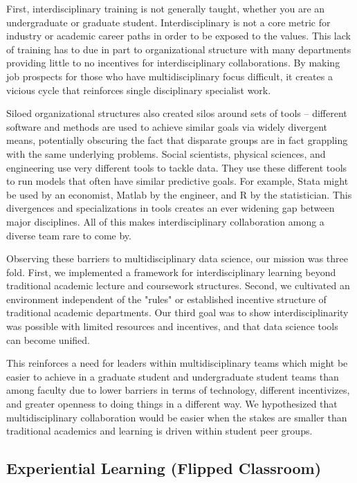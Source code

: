\documentclass{sig-alternate}
\begin{document}
First, interdisciplinary training is not generally taught, whether you are an undergraduate or graduate student. Interdisciplinary is not a core metric for industry or academic career paths in order to be exposed to the values. This lack of training has to due in part to organizational structure with many departments providing little to no incentives for interdisciplinary collaborations. By making job prospects for those who have multidisciplinary focus difficult, it creates a vicious cycle that reinforces single disciplinary specialist work. 

Siloed organizational structures also created silos around sets of tools -- different software and methods are used to achieve similar goals via widely divergent means, potentially obscuring the fact that disparate groups are in fact grappling with the same underlying problems. Social scientists, physical sciences, and engineering use very different tools to tackle data. They use these different tools to run models that often have similar predictive goals. For example, Stata \cite{stata2005stata} might be used by an economist, Matlab \cite{incorporation2005matlab} by the engineer, and R \cite{RCoreTeam2014} by the statistician. This divergences and specializations in tools creates an ever widening gap between major disciplines.  All of this makes interdisciplinary collaboration among a diverse team rare to come by.

Observing these barriers to multidisciplinary data science, our mission was three fold. First, we implemented a framework for interdisciplinary learning beyond traditional academic lecture and coursework structures. Second, we cultivated an environment independent of the "rules" or established incentive structure of traditional academic departments. Our third goal was to show interdisciplinarity was possible with limited resources and incentives, and that data science tools can become unified. 

This reinforces a need for leaders within multidisciplinary teams which might be easier to achieve in a graduate student and undergraduate student teams than among faculty due to lower barriers in terms of technology, different incentivizes, and greater openness to doing things in a different way. We hypothesized that multidisciplinary collaboration would be easier when the stakes are smaller than traditional academics and learning is driven within student peer groups.

\subsection{Experiential Learning (Flipped Classroom)}
\end{document}
